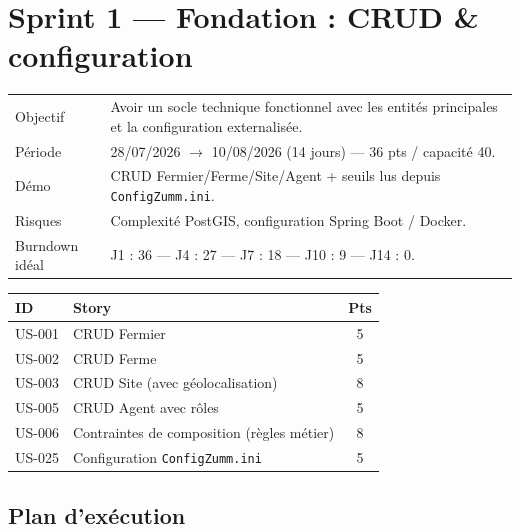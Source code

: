 \section{Sprint 1 --- Fondation : CRUD \& configuration}

\begin{center}
\begin{tabular}{lp{11cm}}
\toprule
Objectif  & Avoir un socle technique fonctionnel avec les entités
            principales et la configuration externalisée. \\
Période   & 28/07/2026 $\rightarrow$ 10/08/2026 (14 jours) --- 36 pts / capacité 40. \\
Démo      & CRUD Fermier/Ferme/Site/Agent + seuils lus depuis
            \texttt{ConfigZumm.ini}. \\
Risques   & Complexité PostGIS, configuration Spring Boot / Docker. \\
Burndown idéal & J1 : 36 --- J4 : 27 --- J7 : 18 --- J10 : 9 --- J14 : 0. \\
\bottomrule
\end{tabular}
\end{center}

\begin{center}
\begin{tabular}{lp{9cm}c}
\toprule
\textbf{ID} & \textbf{Story} & \textbf{Pts} \\
\midrule
US-001 & CRUD Fermier                                & 5 \\
US-002 & CRUD Ferme                                  & 5 \\
US-003 & CRUD Site (avec géolocalisation)            & 8 \\
US-005 & CRUD Agent avec rôles                       & 5 \\
US-006 & Contraintes de composition (règles métier)  & 8 \\
US-025 & Configuration \texttt{ConfigZumm.ini}       & 5 \\
\bottomrule
\end{tabular}
\end{center}

\subsection{Plan d'exécution}

